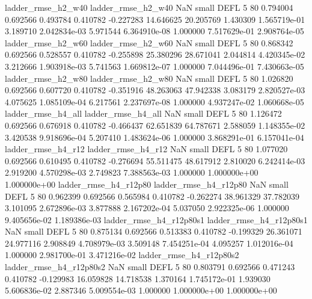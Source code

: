       ladder_rmse_h2_w40       ladder_rmse_h2_w40                   NaN      small     DEFL                 5 80 0.794004       0.692566 0.493784       0.410782   -0.227283     14.646625     20.205769     1.430309   1.565719e-01  3.189710 2.042834e-03     5.971544   6.364910e-08            1.000000    7.517629e-01        2.908764e-05
      ladder_rmse_h2_w60       ladder_rmse_h2_w60                   NaN      small     DEFL                 5 80 0.868342       0.692566 0.528557       0.410782   -0.255898     25.380296     28.671041     2.044814   4.420345e-02  3.212666 1.903918e-03     5.741563   1.669812e-07            1.000000    7.044496e-01        7.430663e-05
      ladder_rmse_h2_w80       ladder_rmse_h2_w80                   NaN      small     DEFL                 5 80 1.026820       0.692566 0.607720       0.410782   -0.351916     48.263063     47.942338     3.083179   2.820527e-03  4.075625 1.085109e-04     6.217561   2.237697e-08            1.000000    4.937247e-02        1.060668e-05
      ladder_rmse_h4_all       ladder_rmse_h4_all                   NaN      small     DEFL                 5 80 1.126472       0.692566 0.676918       0.410782   -0.466437     62.651839     64.787671     2.588059   1.148355e-02  3.420538 9.918696e-04     5.207410   1.483624e-06            1.000000    3.868291e-01        6.157041e-04
      ladder_rmse_h4_r12       ladder_rmse_h4_r12                   NaN      small     DEFL                 5 80 1.077020       0.692566 0.610495       0.410782   -0.276694     55.511475     48.617912     2.810020   6.242414e-03  2.919200 4.570298e-03     2.749823   7.388563e-03            1.000000    1.000000e+00        1.000000e+00
   ladder_rmse_h4_r12p80    ladder_rmse_h4_r12p80                   NaN      small     DEFL                 5 80 0.962399       0.692566 0.565984       0.410782   -0.262274     38.961329     37.782039     3.101095   2.672896e-03  3.877888 2.167202e-04     5.037050   2.922325e-06            1.000000    9.405656e-02        1.189386e-03
 ladder_rmse_h4_r12p80s1  ladder_rmse_h4_r12p80s1                   NaN      small     DEFL                 5 80 0.875134       0.692566 0.513383       0.410782   -0.199329     26.361071     24.977116     2.908849   4.708979e-03  3.509148 7.454251e-04     4.095257   1.012016e-04            1.000000    2.981700e-01        3.471216e-02
 ladder_rmse_h4_r12p80s2  ladder_rmse_h4_r12p80s2                   NaN      small     DEFL                 5 80 0.803791       0.692566 0.471243       0.410782   -0.129983     16.059828     14.718538     1.370164   1.745172e-01  1.939030 5.606836e-02     2.887346   5.009554e-03            1.000000    1.000000e+00        1.000000e+00
